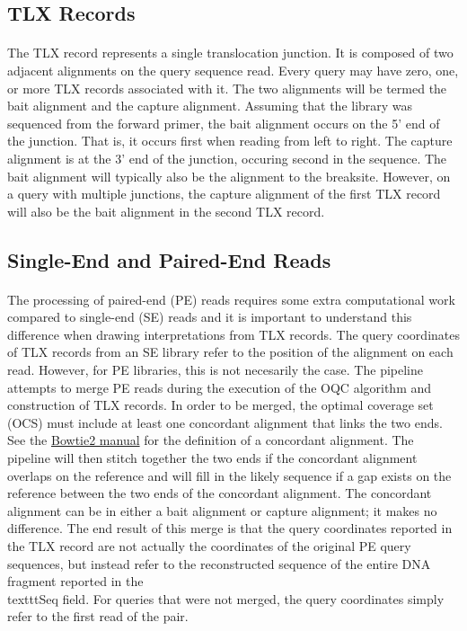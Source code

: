 \documentclass{article}
\begin{document}
\subsection{TLX Records}
\paragraph{} The TLX record represents a single translocation junction. It is composed of two adjacent alignments on the query sequence read. Every query may have zero, one, or more TLX records associated with it. The two alignments will be termed the bait alignment and the capture alignment. Assuming that the library was sequenced from the forward primer, the bait alignment occurs on the 5' end of the junction. That is, it occurs first when reading from left to right. The capture alignment is at the 3' end of the junction, occuring second in the sequence. The bait alignment will typically also be the alignment to the breaksite. However, on a query with multiple junctions, the capture alignment of the first TLX record will also be the bait alignment in the second TLX record.

\subsection{Single-End and Paired-End Reads}
\paragraph{} The processing of paired-end (PE) reads requires some extra computational work compared to single-end (SE) reads and it is important to understand this difference when drawing interpretations from TLX records. The query coordinates of TLX records from an SE library refer to the position of the alignment on each read. However, for PE libraries, this is not necesarily the case. The pipeline attempts to merge PE reads during the execution of the OQC algorithm and construction of TLX records. In order to be merged, the optimal coverage set (OCS) must include at least one concordant alignment that links the two ends. See the \href{http://bowtie-bio.sourceforge.net/bowtie2/manual.shtml}{Bowtie2 manual} for the definition of a concordant alignment. The pipeline will then stitch together the two ends if the concordant alignment overlaps on the reference and will fill in the likely sequence if a gap exists on the reference between the two ends of the concordant alignment. The concordant alignment can be in either a bait alignment or capture alignment; it makes no difference. The end result of this merge is that the query coordinates reported in the TLX record are not actually the coordinates of the original PE query sequences, but instead refer to the reconstructed sequence of the entire DNA fragment reported in the \\texttt{Seq} field. For queries that were not merged, the query coordinates simply refer to the first read of the pair.
\end{document}
